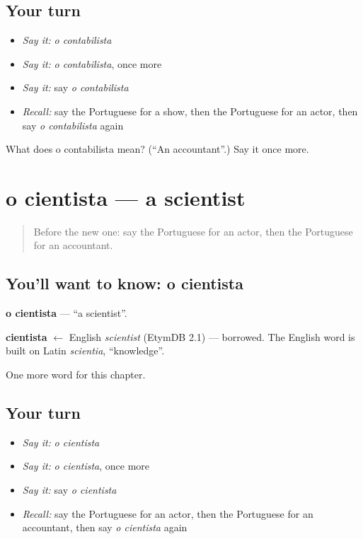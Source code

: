 \subsection*{Your turn}
\begin{itemize}
\raggedright
  \item \emph{Say it:} \emph{o contabilista}
  \item \emph{Say it:} \emph{o contabilista}, once more
  \item \emph{Say it:} say \emph{o contabilista}
  \item \emph{Recall:} say the Portuguese for a show, then the Portuguese for an actor, then say \emph{o contabilista} again
\end{itemize}

\begin{tcolorbox}[breakable,colback=teal!4,colframe=teal!35!black,title={Before you move on}]
What does o contabilista mean? (\textquotedblleft{}An accountant\textquotedblright{}.) Say it once more.
\end{tcolorbox}
\section[o cientista]{o cientista — a scientist}

\label{lesson:PT-C160-cientista}



\begin{quote}
Before the new one: say the Portuguese for an actor, then the Portuguese for an accountant.
\end{quote}

\subsection*{You'll want to know: o cientista}
\textbf{o cientista} — \textquotedblleft{}a scientist\textquotedblright{}.

\begin{cousinweb}
\textbf{cientista} $\leftarrow$ English \emph{scientist} (EtymDB 2.1) — borrowed. The English word is built on Latin \emph{scientia}, \textquotedblleft{}knowledge\textquotedblright{}.
\end{cousinweb}

\begin{grammarlens}[title={What you've built}]
One more word for this chapter.
\end{grammarlens}

\subsection*{Your turn}
\begin{itemize}
\raggedright
  \item \emph{Say it:} \emph{o cientista}
  \item \emph{Say it:} \emph{o cientista}, once more
  \item \emph{Say it:} say \emph{o cientista}
  \item \emph{Recall:} say the Portuguese for an actor, then the Portuguese for an accountant, then say \emph{o cientista} again
\end{itemize}

